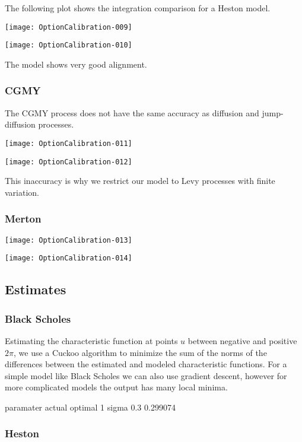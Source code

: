\documentclass{article}
\begin{document}
The following plot shows the integration comparison for a Heston model.

\texttt{[image: OptionCalibration-009]}

\texttt{[image: OptionCalibration-010]}

The model shows very good alignment.

\subsubsection{CGMY}

The CGMY process does not have the same accuracy as diffusion and jump-diffusion processes.

\texttt{[image: OptionCalibration-011]}

\texttt{[image: OptionCalibration-012]}

This inaccuracy is why we restrict our model to Levy processes with finite variation.  

\subsubsection{Merton}

\texttt{[image: OptionCalibration-013]}

\texttt{[image: OptionCalibration-014]}

\subsection{Estimates}

\subsubsection{Black Scholes}
Estimating the characteristic function at points \(u\) between negative and positive \(2\pi\), we use a Cuckoo algorithm to minimize the sum of the norms of the differences between the estimated and modeled characteristic functions.  For a simple model like Black Scholes we can also use gradient descent, however for more complicated models the output has many local minima.  

\begin{Schunk}
\begin{Soutput}
  paramater actual  optimal
1     sigma    0.3 0.299074
\end{Soutput}
\end{Schunk}

\subsubsection{Heston}
\end{document}
